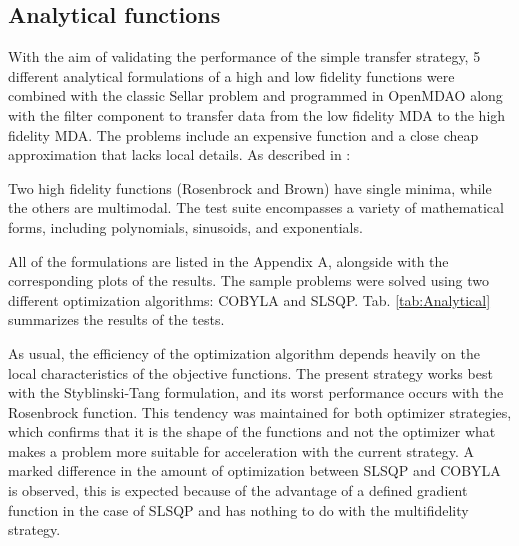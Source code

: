 \documentclass[conf]{new-aiaa}
\begin{document}
\subsection{Analytical functions}
With the aim of validating the performance of the simple transfer strategy, 5 different analytical formulations of a high and low fidelity functions \cite{Bryson2018} were combined with the classic Sellar problem \cite{Sellar1996} and programmed in OpenMDAO along with the filter component to transfer data from the low fidelity MDA to the high fidelity MDA. The problems include an expensive function and a close cheap approximation that lacks local details. As described in \cite{Bryson2018}:
\begin{quoting}
Two high fidelity functions (Rosenbrock and Brown) have single minima, while the others are multimodal. The test suite encompasses a variety of mathematical forms, including polynomials, sinusoids, and exponentials.
\end{quoting} All of the formulations are listed in the Appendix A, alongside with the corresponding plots of the results. The sample problems were solved using two different optimization algorithms: COBYLA and SLSQP. Tab. \ref{tab:Analytical} summarizes the results of the tests. 
\par As usual, the efficiency of the optimization algorithm depends heavily on the local characteristics of the objective functions. The present strategy works best with the Styblinski-Tang formulation, and its worst performance occurs with the Rosenbrock function. This tendency was maintained for both optimizer strategies, which confirms that it is the shape of the functions and not the optimizer what makes a problem more suitable for acceleration with the current strategy. A marked difference in the amount of optimization between SLSQP and COBYLA is observed, this is expected because of the advantage of a defined gradient function in the case of SLSQP and has nothing to do with the multifidelity strategy.
\end{document}
